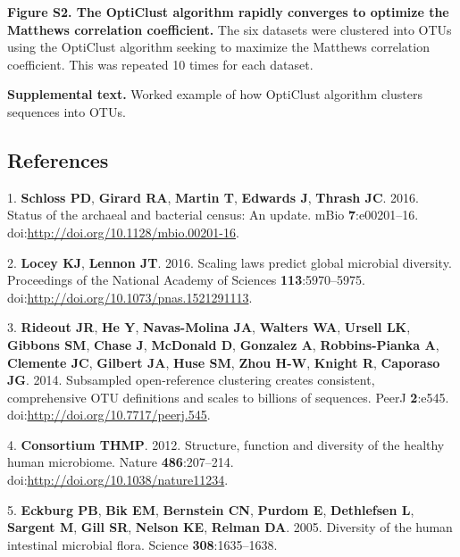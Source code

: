 \documentclass[11pt,]{article}
\begin{document}
\textbf{Figure S2. The OptiClust algorithm rapidly converges to optimize
the Matthews correlation coefficient.} The six datasets were clustered
into OTUs using the OptiClust algorithm seeking to maximize the Matthews
correlation coefficient. This was repeated 10 times for each dataset.

\textbf{Supplemental text.} Worked example of how OptiClust algorithm
clusters sequences into OTUs.

\newpage

\subsection*{References}\label{references}

1. \textbf{Schloss PD}, \textbf{Girard RA}, \textbf{Martin T},
\textbf{Edwards J}, \textbf{Thrash JC}. 2016. Status of the archaeal and
bacterial census: An update. mBio \textbf{7}:e00201--16.
doi:\url{http://doi.org/10.1128/mbio.00201-16}.

2. \textbf{Locey KJ}, \textbf{Lennon JT}. 2016. Scaling laws predict
global microbial diversity. Proceedings of the National Academy of
Sciences \textbf{113}:5970--5975.
doi:\url{http://doi.org/10.1073/pnas.1521291113}.

3. \textbf{Rideout JR}, \textbf{He Y}, \textbf{Navas-Molina JA},
\textbf{Walters WA}, \textbf{Ursell LK}, \textbf{Gibbons SM},
\textbf{Chase J}, \textbf{McDonald D}, \textbf{Gonzalez A},
\textbf{Robbins-Pianka A}, \textbf{Clemente JC}, \textbf{Gilbert JA},
\textbf{Huse SM}, \textbf{Zhou H-W}, \textbf{Knight R}, \textbf{Caporaso
JG}. 2014. Subsampled open-reference clustering creates consistent,
comprehensive OTU definitions and scales to billions of sequences. PeerJ
\textbf{2}:e545. doi:\url{http://doi.org/10.7717/peerj.545}.

4. \textbf{Consortium THMP}. 2012. Structure, function and diversity of
the healthy human microbiome. Nature \textbf{486}:207--214.
doi:\url{http://doi.org/10.1038/nature11234}.

5. \textbf{Eckburg PB}, \textbf{Bik EM}, \textbf{Bernstein CN},
\textbf{Purdom E}, \textbf{Dethlefsen L}, \textbf{Sargent M},
\textbf{Gill SR}, \textbf{Nelson KE}, \textbf{Relman DA}. 2005.
Diversity of the human intestinal microbial flora. Science
\textbf{308}:1635--1638.
\end{document}

